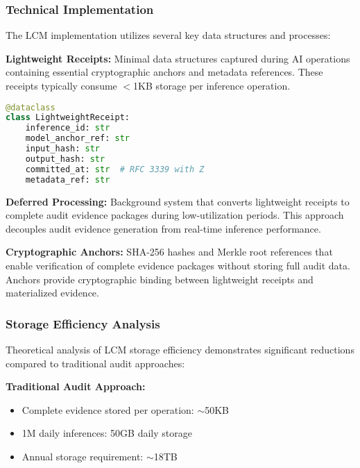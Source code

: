 \documentclass[12pt,a4paper]{article}
\begin{document}
\subsubsection{Technical Implementation}

The LCM implementation utilizes several key data structures and processes:

\textbf{Lightweight Receipts:} Minimal data structures captured during AI operations containing essential cryptographic anchors and metadata references. These receipts typically consume $<$1KB storage per inference operation.

\begin{lstlisting}[language=Python, caption=Lightweight Receipt Data Structure]
@dataclass
class LightweightReceipt:
    inference_id: str
    model_anchor_ref: str
    input_hash: str
    output_hash: str
    committed_at: str  # RFC 3339 with Z
    metadata_ref: str
\end{lstlisting}

\begin{center}
\end{center}

\textbf{Deferred Processing:} Background system that converts lightweight receipts to complete audit evidence packages during low-utilization periods. This approach decouples audit evidence generation from real-time inference performance.

\textbf{Cryptographic Anchors:} SHA-256 hashes and Merkle root references that enable verification of complete evidence packages without storing full audit data. Anchors provide cryptographic binding between lightweight receipts and materialized evidence.

\subsubsection{Storage Efficiency Analysis}

Theoretical analysis of LCM storage efficiency demonstrates significant reductions compared to traditional audit approaches:

\textbf{Traditional Audit Approach:}
\begin{itemize}
\item Complete evidence stored per operation: $\sim$50KB
\item 1M daily inferences: 50GB daily storage
\item Annual storage requirement: $\sim$18TB
\end{itemize}
\end{document}
